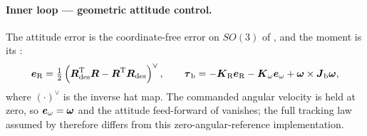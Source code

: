 \paragraph{Inner loop --- geometric attitude control.} The attitude error is the coordinate-free
error on $SO(3)$ of \parencite[Eq.~(21)]{lee2010geometric}, and the moment is its
\parencite[Eq.~(20)]{lee2010geometric}:
\begin{equation}\label{eq:method:dep:inner}
  \boldsymbol{e}_{\textrm{R}} = \tfrac{1}{2}\left(\boldsymbol{R}_{\textrm{des}}^{\textrm{T}}\boldsymbol{R} - \boldsymbol{R}^{\textrm{T}}\boldsymbol{R}_{\textrm{des}}\right)^{\vee},
  \qquad
  \boldsymbol{\tau}_{\textrm{b}} = -\boldsymbol{K}_{\textrm{R}}\boldsymbol{e}_{\textrm{R}} - \boldsymbol{K}_{\omega}\boldsymbol{e}_{\omega}
      + \boldsymbol{\omega}\times\boldsymbol{J}_{\textrm{b}}\boldsymbol{\omega},
\end{equation}
where $(\cdot)^{\vee}$ is the inverse hat map. The commanded angular velocity is held at zero, so
$\boldsymbol{e}_{\omega} = \boldsymbol{\omega}$ and the attitude feed-forward of
\parencite[Eq.~(20)]{lee2010geometric} vanishes; the full tracking law assumed by \parencite[Prop.~3]{lee2010geometric} therefore differs from this
zero-angular-reference implementation.

